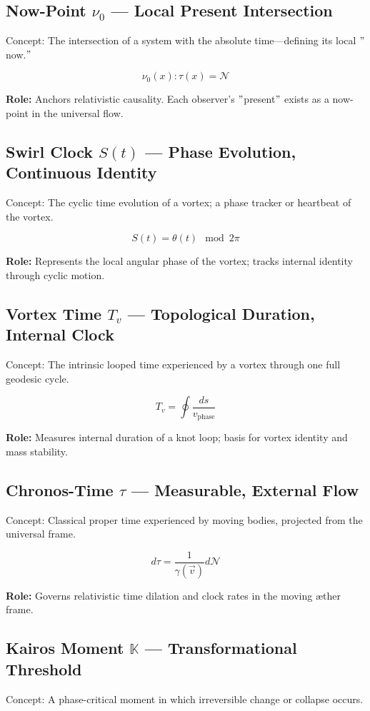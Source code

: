 \documentclass[a4paper,12pt]{article}
\begin{document}
\subsection*{Now-Point $\nu_0$ — Local Present Intersection}
Concept: The intersection of a system with the absolute time—defining its local \("\)now.\("\)


\[
\nu_0(x) : \tau(x) = \mathcal{N}
\]

\textbf{Role:} Anchors relativistic causality. Each observer's \("\)present\("\) exists as a now-point in the universal flow.

\subsection*{Swirl Clock $S(t)$ — Phase Evolution, Continuous Identity}
Concept: The cyclic time evolution of a vortex; a phase tracker or heartbeat of the vortex.


\[
S(t) = \theta(t) \mod 2\pi
\]

\textbf{Role:} Represents the local angular phase of the vortex; tracks internal identity through cyclic motion.

\subsection*{Vortex Time $T_v$ — Topological Duration, Internal Clock}
Concept: The intrinsic looped time experienced by a vortex through one full geodesic cycle.


\[
T_v = \oint \frac{ds}{v_{\text{phase}}}
\]

\textbf{Role:} Measures internal duration of a knot loop; basis for vortex identity and mass stability.

\subsection*{Chronos-Time $\tau$ — Measurable, External Flow}
Concept: Classical proper time experienced by moving bodies, projected from the universal frame.


\[
d\tau = \frac{1}{\gamma(\vec{v})} d\mathcal{N}
\]

\textbf{Role:} Governs relativistic time dilation and clock rates in the moving æther frame.

\subsection*{Kairos Moment $\mathbb{K}$ — Transformational Threshold}
Concept: A phase-critical moment in which irreversible change or collapse occurs.
\end{document}
